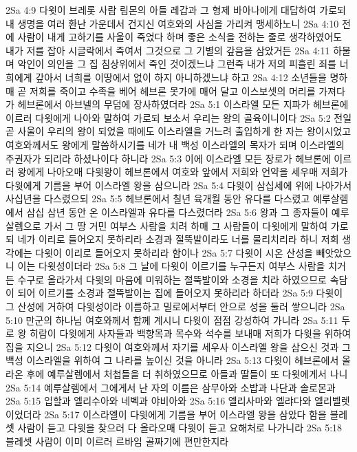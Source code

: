 2Sa 4:9  다윗이 브레롯 사람 림몬의 아들 레갑과 그 형제 바아나에게 대답하여 가로되 내 생명을 여러 환난 가운데서 건지신 여호와의 사심을 가리켜 맹세하노니
2Sa 4:10  전에 사람이 내게 고하기를 사울이 죽었다 하며 좋은 소식을 전하는 줄로 생각하였어도 내가 저를 잡아 시글락에서 죽여서 그것으로 그 기별의 갚음을 삼았거든
2Sa 4:11  하물며 악인이 의인을 그 집 침상위에서 죽인 것이겠느냐 그런즉 내가 저의 피흘린 죄를 너희에게 갚아서 너희를 이땅에서 없이 하지 아니하겠느냐 하고
2Sa 4:12  소년들을 명하매 곧 저희를 죽이고 수족을 베어 헤브론 못가에 매어 달고 이스보셋의 머리를 가져다가 헤브론에서 아브넬의 무덤에 장사하였더라
2Sa 5:1  이스라엘 모든 지파가 헤브론에 이르러 다윗에게 나아와 말하여 가로되 보소서 우리는 왕의 골육이니이다
2Sa 5:2  전일 곧 사울이 우리의 왕이 되었을 때에도 이스라엘을 거느려 출입하게 한 자는 왕이시었고 여호와께서도 왕에게 말씀하시기를 네가 내 백성 이스라엘의 목자가 되며 이스라엘의 주권자가 되리라 하셨나이다 하니라
2Sa 5:3  이에 이스라엘 모든 장로가 헤브론에 이르러 왕에게 나아오매 다윗왕이 헤브론에서 여호와 앞에서 저희와 언약을 세우매 저희가 다윗에게 기름을 부어 이스라엘 왕을 삼으니라
2Sa 5:4  다윗이 삼십세에 위에 나아가서 사십년을 다스렸으되
2Sa 5:5  헤브론에서 칠년 육개월 동안 유다를 다스렸고 예루살렘에서 삼십 삼년 동안 온 이스라엘과 유다를 다스렸더라
2Sa 5:6  왕과 그 종자들이 예루살렘으로 가서 그 땅 거민 여부스 사람을 치려 하매 그 사람들이 다윗에게 말하여 가로되 네가 이리로 들어오지 못하리라 소경과 절뚝발이라도 너를 물리치리라 하니 저희 생각에는 다윗이 이리로 들어오지 못하리라 함이나
2Sa 5:7  다윗이 시온 산성을 빼앗았으니 이는 다윗성이더라
2Sa 5:8  그 날에 다윗이 이르기를 누구든지 여부스 사람을 치거든 수구로 올라가서 다윗의 마음에 미워하는 절뚝발이와 소경을 치라 하였으므로 속담이 되어 이르기를 소경과 절뚝발이는 집에 들어오지 못하리라 하더라
2Sa 5:9  다윗이 그 산성에 거하여 다윗성이라 이름하고 밀로에서부터 안으로 성을 둘러 쌓으니라
2Sa 5:10  만군의 하나님 여호와께서 함께 계시니 다윗이 점점 강성하여 가니라
2Sa 5:11  두로 왕 히람이 다윗에게 사자들과 백향목과 목수와 석수를 보내매 저희가 다윗을 위하여 집을 지으니
2Sa 5:12  다윗이 여호와께서 자기를 세우사 이스라엘 왕을 삼으신 것과 그 백성 이스라엘을 위하여 그 나라를 높이신 것을 아니라
2Sa 5:13  다윗이 헤브론에서 올라온 후에 예루살렘에서 처첩들을 더 취하였으므로 아들과 딸들이 또 다윗에게서 나니
2Sa 5:14  예루살렘에서 그에게서 난 자의 이름은 삼무아와 소밥과 나단과 솔로몬과
2Sa 5:15  입할과 엘리수아와 네벡과 야비아와
2Sa 5:16  엘리사마와 엘랴다와 엘리벨렛이었더라
2Sa 5:17  이스라엘이 다윗에게 기름을 부어 이스라엘 왕을 삼았다 함을 블레셋 사람이 듣고 다윗을 찾으러 다 올라오매 다윗이 듣고 요해처로 나가니라
2Sa 5:18  블레셋 사람이 이미 이르러 르바임 골짜기에 편만한지라
